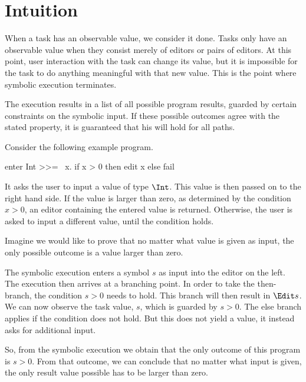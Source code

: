 


\section{Intuition}
\label{sec:intuition}

When a task has an observable value, we consider it done.
Tasks only have an observable value when they consist merely of editors or pairs of editors.
At this point, user interaction with the task can change its value, but it is impossible for the task to do anything meaningful with that new value.
This is the point where symbolic execution terminates.

The execution results in a list of all possible program results,
guarded by certain constraints on the symbolic input.
If these possible outcomes agree with the stated property,
it is guaranteed that his will hold for all paths.

\begin{example}
Consider the following example program.

\begin{TASK}
  enter Int >>= \ x. if x > 0 then edit x else fail
\end{TASK}

It asks the user to input a value of type $\Int$.
This value is then passed on to the right hand side.
If the value is larger than zero, as determined by the condition $x>0$,
an editor containing the entered value is returned.
Otherwise, the user is asked to input a different value, until the condition holds.

Imagine we would like to prove that no matter what value is given as input,
the only possible outcome is a value larger than zero.

The symbolic execution enters a symbol $s$ as input into the editor on the left.
The execution then arrives at a branching point.
In order to take the then-branch, the condition $s > 0$ needs to hold.
This branch will then result in $\Edit s$.
We can now observe the task value, $s$, which is guarded by $s > 0$.
The else branch applies if the condition does not hold.
But this does not yield a value, it instead asks for additional input.

So, from the symbolic execution we obtain that the only outcome of this program is $s > 0$.
From that outcome, we can conclude that no matter what input is given, the only result value possible has to be larger than zero.
\label{example:abs}
\end{example}
